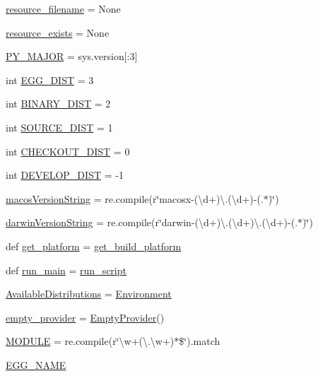 \begin{DoxyCompactItemize}
\item 
\hyperlink{namespacepkg__resources_a4d232c3e3dfb85fb17099b9d156df66f}{resource\+\_\+filename} = None
\item 
\hyperlink{namespacepkg__resources_a52c1ee536d5f0602a4dfbfb43a506fae}{resource\+\_\+exists} = None
\item 
\hyperlink{namespacepkg__resources_a27901fd744697f2b2d55b6f1255cf020}{P\+Y\+\_\+\+M\+A\+J\+OR} = sys.\+version\mbox{[}\+:3\mbox{]}
\item 
int \hyperlink{namespacepkg__resources_a6710a7d7eb62b157b3d75a3c79b48c01}{E\+G\+G\+\_\+\+D\+I\+ST} = 3
\item 
int \hyperlink{namespacepkg__resources_a58feeedc42610e3784dd6ee321d7cdfc}{B\+I\+N\+A\+R\+Y\+\_\+\+D\+I\+ST} = 2
\item 
int \hyperlink{namespacepkg__resources_a01daed33b49fd789a3b4677cea50dd53}{S\+O\+U\+R\+C\+E\+\_\+\+D\+I\+ST} = 1
\item 
int \hyperlink{namespacepkg__resources_ac18133cb42656103587b079dfddb0570}{C\+H\+E\+C\+K\+O\+U\+T\+\_\+\+D\+I\+ST} = 0
\item 
int \hyperlink{namespacepkg__resources_a3831b5c990f62e01f97b3a4f33a75a83}{D\+E\+V\+E\+L\+O\+P\+\_\+\+D\+I\+ST} = -\/1
\item 
\hyperlink{namespacepkg__resources_a3695a1e24be4d45381a48809b15e13d1}{macos\+Version\+String} = re.\+compile(r\char`\"{}macosx-\/(\textbackslash{}d+)\textbackslash{}.(\textbackslash{}d+)-\/(.$\ast$)\char`\"{})
\item 
\hyperlink{namespacepkg__resources_aa2d17171c1a4bc937a48907c530f76ae}{darwin\+Version\+String} = re.\+compile(r\char`\"{}darwin-\/(\textbackslash{}d+)\textbackslash{}.(\textbackslash{}d+)\textbackslash{}.(\textbackslash{}d+)-\/(.$\ast$)\char`\"{})
\item 
def \hyperlink{namespacepkg__resources_a2afbdfa7252b3903db74ac7b3d22e922}{get\+\_\+platform} = \hyperlink{namespacepkg__resources_a428a5468ed29d9fc3a2c9c7b3c69d4d8}{get\+\_\+build\+\_\+platform}
\item 
def \hyperlink{namespacepkg__resources_a101caa60453ee041d96dc4d43b5a9518}{run\+\_\+main} = \hyperlink{namespacepkg__resources_a37b3befc5c87a30dc05883907e765d4d}{run\+\_\+script}
\item 
\hyperlink{namespacepkg__resources_ab2650bbd95cc1c4076b7853c43c97cf9}{Available\+Distributions} = \hyperlink{classpkg__resources_1_1_environment}{Environment}
\item 
\hyperlink{namespacepkg__resources_ad4a5f62f100fdb128f15480d4fd2f007}{empty\+\_\+provider} = \hyperlink{classpkg__resources_1_1_empty_provider}{Empty\+Provider}()
\item 
\hyperlink{namespacepkg__resources_a084f41f0d9228b901649251a09c6cbdf}{M\+O\+D\+U\+LE} = re.\+compile(r\char`\"{}\textbackslash{}w+(\textbackslash{}.\textbackslash{}w+)$\ast$\$\char`\"{}).match
\item 
\hyperlink{namespacepkg__resources_a1971b341425adaa3e52d5572f7240d8e}{E\+G\+G\+\_\+\+N\+A\+ME}
\end{DoxyCompactItemize}


